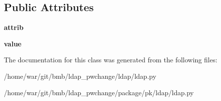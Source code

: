 \subsection*{Public Attributes}
\begin{DoxyCompactItemize}
\item 
\hypertarget{classldap_1_1ldap_1_1LDAPFilterItem_a0c3b5368680ad976066389008389df65}{{\bfseries attrib}}\label{classldap_1_1ldap_1_1LDAPFilterItem_a0c3b5368680ad976066389008389df65}

\item 
\hypertarget{classldap_1_1ldap_1_1LDAPFilterItem_a19832ead54944cf6a7a091991d797ec5}{{\bfseries value}}\label{classldap_1_1ldap_1_1LDAPFilterItem_a19832ead54944cf6a7a091991d797ec5}

\end{DoxyCompactItemize}


The documentation for this class was generated from the following files\-:\begin{DoxyCompactItemize}
\item 
/home/war/git/bmb/ldap\-\_\-pwchange/ldap/ldap.\-py\item 
/home/war/git/bmb/ldap\-\_\-pwchange/package/pk/ldap/ldap.\-py\end{DoxyCompactItemize}
